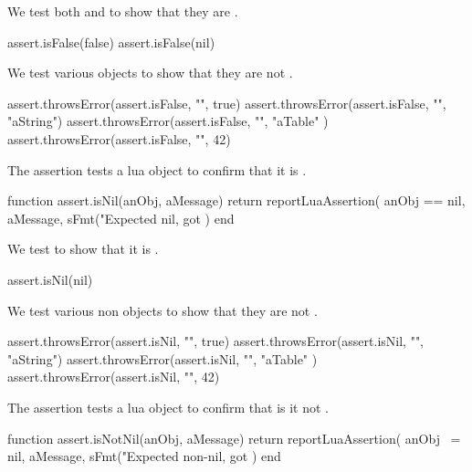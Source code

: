 
We test both  and  to show that they are 
. 

\startLuaTest
  assert.isFalse(false)
  assert.isFalse(nil)
\stopLuaTest
\stopTestCase


We test various objects to show that they are not .

\startLuaTest
  assert.throwsError(assert.isFalse, "", true)
  assert.throwsError(assert.isFalse, "", "aString")
  assert.throwsError(assert.isFalse, "", { "aTable" })
  assert.throwsError(assert.isFalse, "", 42)
\stopLuaTest
\stopTestCase

\stopTestSuite


The  assertion tests a lua object to confirm that it is 
. 

\startLuaCode
function assert.isNil(anObj, aMessage)
  return reportLuaAssertion(
    anObj == nil,
    aMessage,
    sFmt("Expected nil, got %
  )
end
\stopLuaCode


We test  to show that it is . 

\startLuaTest
  assert.isNil(nil)
\stopLuaTest
\stopTestCase


We test various non  objects to show that they are not 
. 

\startLuaTest
  assert.throwsError(assert.isNil, "", true)
  assert.throwsError(assert.isNil, "", "aString")
  assert.throwsError(assert.isNil, "", { "aTable" })
  assert.throwsError(assert.isNil, "", 42)
\stopLuaTest
\stopTestCase

\stopTestSuite


The  assertion tests a lua object to confirm that is 
it not . 

\startLuaCode
function assert.isNotNil(anObj, aMessage)
  return reportLuaAssertion(
    anObj ~= nil,
    aMessage,
    sFmt("Expected non-nil, got %
  )
end
\stopLuaCode


